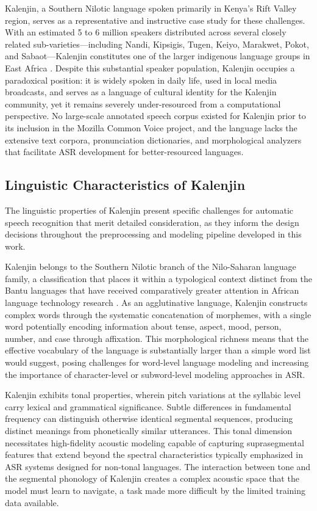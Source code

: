 \documentclass[12pt,a4paper]{article}
\begin{document}
Kalenjin, a Southern Nilotic language spoken primarily in Kenya's Rift Valley region, serves as a representative and instructive case study for these challenges. With an estimated 5 to 6 million speakers distributed across several closely related sub-varieties---including Nandi, Kipsigis, Tugen, Keiyo, Marakwet, Pokot, and Sabaot---Kalenjin constitutes one of the larger indigenous language groups in East Africa \citep{toweett1979study}. Despite this substantial speaker population, Kalenjin occupies a paradoxical position: it is widely spoken in daily life, used in local media broadcasts, and serves as a language of cultural identity for the Kalenjin community, yet it remains severely under-resourced from a computational perspective. No large-scale annotated speech corpus existed for Kalenjin prior to its inclusion in the Mozilla Common Voice project, and the language lacks the extensive text corpora, pronunciation dictionaries, and morphological analyzers that facilitate ASR development for better-resourced languages.

\subsection{Linguistic Characteristics of Kalenjin}

The linguistic properties of Kalenjin present specific challenges for automatic speech recognition that merit detailed consideration, as they inform the design decisions throughout the preprocessing and modeling pipeline developed in this work.

Kalenjin belongs to the Southern Nilotic branch of the Nilo-Saharan language family, a classification that places it within a typological context distinct from the Bantu languages that have received comparatively greater attention in African language technology research \citep{rottland1982southern}. As an agglutinative language, Kalenjin constructs complex words through the systematic concatenation of morphemes, with a single word potentially encoding information about tense, aspect, mood, person, number, and case through affixation. This morphological richness means that the effective vocabulary of the language is substantially larger than a simple word list would suggest, posing challenges for word-level language modeling and increasing the importance of character-level or subword-level modeling approaches in ASR.

Kalenjin exhibits tonal properties, wherein pitch variations at the syllabic level carry lexical and grammatical significance. Subtle differences in fundamental frequency can distinguish otherwise identical segmental sequences, producing distinct meanings from phonetically similar utterances. This tonal dimension necessitates high-fidelity acoustic modeling capable of capturing suprasegmental features that extend beyond the spectral characteristics typically emphasized in ASR systems designed for non-tonal languages. The interaction between tone and the segmental phonology of Kalenjin creates a complex acoustic space that the model must learn to navigate, a task made more difficult by the limited training data available.
\end{document}
